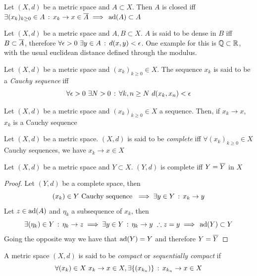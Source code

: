 \documentclass[../complete.tex]{subfiles}
\begin{document}
\begin{prop}
	Let $(X,d)$ be a metric space and $A\subset X$. Then $A$ is closed iff $\exists(x_k)_{k\ge0}\in A\, :\,  x_k\to x\in\overline{A}\implies{}\operatorname{ad}(A)\subset A$
\end{prop}
\begin{dfn}
	Let $(X,d)$ be a metric space and $A,B\subset X$. $A$ is said to be dense in $B$ iff $B\subset\overline{A}$, therefore $\forall\epsilon>0\ \exists y\in A\, :\,  d(x,y)<\epsilon$. One example for this is $\mathbb{Q}\subset\mathbb{R}$, with the usual euclidean distance defined through the modulus.
\end{dfn}
\begin{dfn}
	Let $(X,d)$ be a metric space and $(x_k)_{k\ge0}\in X$. The sequence $x_k$ is said to be a \textit{Cauchy sequence} iff
	\begin{equation*}
		\forall\epsilon>0\ \exists N>0\, :\, \forall k,n\ge N\ d(x_k,x_n)<\epsilon
	\end{equation*}
\end{dfn}
\begin{prop}
	Let $(X,d)$ be a metric space and $(x_k)_{k\ge0}\in X$ a sequence. Then, if $x_k\to x$, $x_k$ is a Cauchy sequence
\end{prop}
\begin{dfn}
	Let $(X,d)$ be a metric space. $(X,d)$ is said to be \textit{complete} iff $\forall(x_k)_{k\ge0}\in X$ Cauchy sequences, we have $x_k\to x\in X$
\end{dfn}
\begin{thm}[Completeness]
	Let $(X,d)$ be a metric space and $Y\subset X$. $(Y,d)$ is complete iff $Y=\overline{Y}$ in $X$
\end{thm}
\begin{proof}
	Let $(Y,d)$ be a complete space, then
	\begin{equation*}
		(x_k)\in Y\text{ Cauchy sequence }\implies{}\exists y\in Y\, :\,  x_k\to y
	\end{equation*}
	Let $z\in\operatorname{ad}(A)$ and $\eta_k$ a subsequence of $x_k$, then
	\begin{equation*}
		\exists(\eta_k)\in Y\, :\, \eta_k\to z\implies{}\exists y\in Y\, :\, \eta_k\to y\ \therefore z=y\implies{} \operatorname{ad}(Y)\subset Y
	\end{equation*}
	Going the opposite way we have that $\operatorname{ad}(Y)=Y$ and therefore $Y=\overline{Y}$
\end{proof}
\begin{dfn}
	A metric space $(X,d)$ is said to be \textit{compact} or \textit{sequentially compact} if
	\begin{equation*}
		\forall(x_k)\in X\ x_k\to x\in X, \exists\{(x_{k_n})\}\, :\,  x_{k_n}\to x\in X
	\end{equation*}
\end{dfn}
\end{document}
